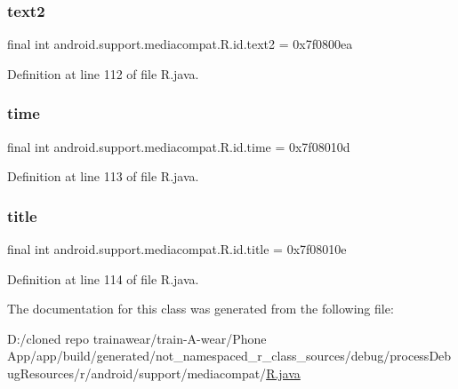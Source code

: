 \mbox{\label{classandroid_1_1support_1_1mediacompat_1_1_r_1_1id_af89db6d57c69dfd896242a53693866c9}} 
\subsubsection{\texorpdfstring{text2}{text2}}
{\footnotesize\ttfamily final int android.\+support.\+mediacompat.\+R.\+id.\+text2 = 0x7f0800ea\hspace{0.3cm}{\ttfamily [static]}}



Definition at line 112 of file R.\+java.

\mbox{\label{classandroid_1_1support_1_1mediacompat_1_1_r_1_1id_af3ae580d9965637cb4e92633f0d964ee}} 
\subsubsection{\texorpdfstring{time}{time}}
{\footnotesize\ttfamily final int android.\+support.\+mediacompat.\+R.\+id.\+time = 0x7f08010d\hspace{0.3cm}{\ttfamily [static]}}



Definition at line 113 of file R.\+java.

\mbox{\label{classandroid_1_1support_1_1mediacompat_1_1_r_1_1id_a6040b8dfeb6da7cd9778754e38ed9bb3}} 
\subsubsection{\texorpdfstring{title}{title}}
{\footnotesize\ttfamily final int android.\+support.\+mediacompat.\+R.\+id.\+title = 0x7f08010e\hspace{0.3cm}{\ttfamily [static]}}



Definition at line 114 of file R.\+java.



The documentation for this class was generated from the following file\+:\begin{DoxyCompactItemize}
\item 
D\+:/cloned repo trainawear/train-\/\+A-\/wear/\+Phone App/app/build/generated/not\+\_\+namespaced\+\_\+r\+\_\+class\+\_\+sources/debug/process\+Debug\+Resources/r/android/support/mediacompat/\mbox{\hyperlink{process_debug_resources_2r_2android_2support_2mediacompat_2_r_8java}{R.\+java}}\end{DoxyCompactItemize}
